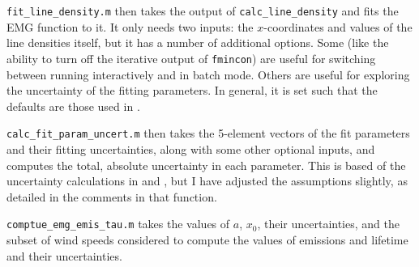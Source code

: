 \documentclass[12pt]{article}
\begin{document}
		\lstinline$fit_line_density.m$ then takes the output of \lstinline$calc_line_density$ and fits the EMG function to it. It only needs two inputs: the $x$-coordinates and values of the line densities itself, but it has a number of additional options. Some (like the ability to turn off the iterative output of \lstinline$fmincon$) are useful for switching between running interactively and in batch mode. Others are useful for exploring the uncertainty of the fitting parameters. In general, it is set such that the defaults are those used in \citet{laughner16}.
		
		\lstinline$calc_fit_param_uncert.m$ then takes the 5-element vectors of the fit parameters and their fitting uncertainties, along with some other optional inputs, and computes the total, absolute uncertainty in each parameter. This is based of the uncertainty calculations in \citet{beirle11} and \citet{lu15}, but I have adjusted the assumptions slightly, as detailed in the comments in that function.
		
		\lstinline$comptue_emg_emis_tau.m$ takes the values of $a$, $x_0$, their uncertainties, and the subset of wind speeds considered to compute the values of emissions and lifetime and their uncertainties.
		
\end{document}
